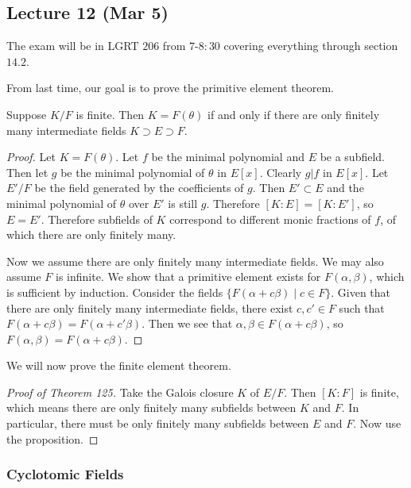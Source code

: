 \documentclass[10pt, twoside]{article}
\begin{document}
        \subsection{Lecture 12 (Mar 5)}
        
        The exam will be in LGRT $206$ from $7$-$8:30$ covering everything through section $14.2$.
        
        From last time, our goal is to prove the primitive element theorem.

        \begin{prop}
            Suppose $K/F$ is finite. Then $K = F(\theta)$ if and only if there are only finitely many intermediate fields $K \supset E \supset F$.
            \begin{proof}
                Let $K = F(\theta)$. Let $f$ be the minimal polynomial and $E$ be a subfield. Then let $g$ be the minimal polynomial of $\theta$ in $E[x]$. Clearly $g | f$ in $E[x]$. Let $E'/F$ be the field generated by the coefficients of $g$. Then $E' \subset E$ and the minimal polynomial of $\theta$ over $E'$ is still $g$. Therefore $[K:E] = [K:E']$, so $E = E'$. Therefore subfields of $K$ correspond to different monic fractions of $f$, of which there are only finitely many.

                Now we assume there are only finitely many intermediate fields. We may also assume $F$ is infinite. We show that a primitive element exists for $F(\alpha, \beta)$, which is sufficient by induction. Consider the fields $\{F(\alpha+c\beta) \mid c \in F\}$. Given that there are only finitely many intermediate fields, there exist $c,c' \in F$ such that $F(\alpha+c\beta) = F(\alpha+c'\beta)$. Then we see that $\alpha,\beta \in F(\alpha+c\beta)$, so $F(\alpha, \beta) = F(\alpha+c\beta)$.
            \end{proof}
        \end{prop}

        We will now prove the finite element theorem.
        \begin{proof}[Proof of Theorem 125]
            Take the Galois closure $K$ of $E/F$. Then $[K:F]$ is finite, which means there are only finitely many subfields between $K$ and $F$. In particular, there must be only finitely many subfields between $E$ and $F$. Now use the proposition.
        \end{proof}

        \subsubsection{Cyclotomic Fields}
        
\end{document}
